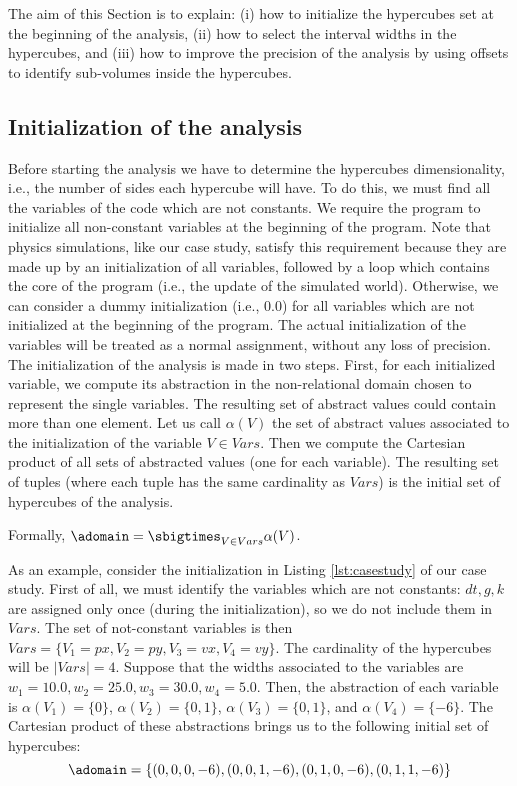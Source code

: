 The aim of this Section is to explain: (i) how to initialize the hypercubes set at the beginning of the analysis, (ii) how to select the interval widths in the hypercubes, and (iii) how to improve the precision of the analysis by using offsets to identify sub-volumes inside the hypercubes. 

\subsection{Initialization of the analysis} \label{sec:initialization}
Before starting the analysis we have to determine the hypercubes dimensionality, i.e., the number of sides each hypercube will have. To do this, we must find all the variables of the code which are not constants. %
We require the program to initialize all non-constant variables at the beginning of the program. Note that physics simulations, like our case study, satisfy this requirement because they are made up by an initialization of all variables, followed by a  loop which contains the core of the program (i.e., the update of the simulated world). Otherwise, we can consider a dummy initialization (i.e., $0.0$) for all variables which are not initialized at the beginning of the program. The actual initialization of the variables will be treated as a normal assignment, without any loss of precision. 
The initialization of the analysis is made in two steps. First, for each initialized variable, we compute its abstraction in the non-relational domain chosen to represent the single variables. The resulting set of abstract values could contain more than one element. Let us call $\alpha(V)$ the set of abstract values associated to the initialization of the variable $V \in Vars$. Then we compute the Cartesian product of all sets of abstracted values (one for each variable). The resulting set of tuples (where each tuple has the same cardinality as $Vars$) is the initial set of hypercubes of the analysis. 

Formally, $\adomain = \sbigtimes_{V \in Vars} {\alpha(V)}$.

As an example, consider the initialization in Listing \ref{lst:casestudy} of our case study. First of all, we must identify the variables which are not constants: $dt,g,k$ are assigned only once (during the initialization), so we do not include them in $Vars$. The set of not-constant variables is then $Vars = \{ V_1 = px, V_2 = py, V_3 = vx, V_4 = vy \}$. The cardinality of the hypercubes will be $|Vars| = 4$. Suppose that the widths associated to the variables are  $w_1 = 10.0, w_2 = 25.0, w_3 = 30.0, w_4 = 5.0$. Then, the abstraction of each variable is $\alpha(V_1) = \{ 0 \}$, $\alpha(V_2) = \{ 0, 1 \}$, $\alpha(V_3) = \{ 0, 1 \}$, and $\alpha(V_4) = \{ -6 \}$.
The Cartesian product of these abstractions brings us to the following initial set of hypercubes:
$$\adomain = \{ (0,0,0,-6) , (0,0,1,-6) , (0,1,0,-6) , (0,1,1,-6) \}$$

